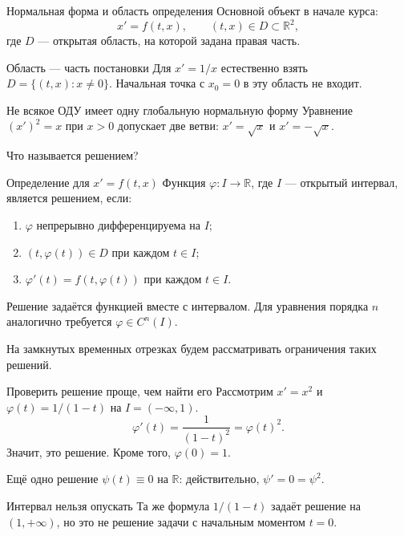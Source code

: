\documentclass[aspectratio=169,11pt]{beamer}
\newcommand{\R}{\mathbb R}
\begin{document}
\begin{frame}{Нормальная форма и область определения}
  Основной объект в начале курса:
  \[
    \boxed{x'=f(t,x)},\qquad (t,x)\in D\subset\R^2,
  \]
  где $D$ --- открытая область, на которой задана правая часть.
  \begin{exampleblock}{Область --- часть постановки}
    Для $x'=1/x$ естественно взять $D=\{(t,x):x\ne0\}$.
    Начальная точка с $x_0=0$ в эту область не входит.
  \end{exampleblock}
  \begin{alertblock}{Не всякое ОДУ имеет одну глобальную нормальную форму}
    Уравнение $(x')^2=x$ при $x>0$ допускает две ветви:
    $x'=\sqrt{x}$ и $x'=-\sqrt{x}$.
  \end{alertblock}
\end{frame}

\begin{frame}{Что называется решением?}
  \begin{block}{Определение для $x'=f(t,x)$}
    Функция $\varphi:I\to\R$, где $I$ --- открытый интервал,
    является \alert{решением}, если:
    \begin{enumerate}
      \item $\varphi$ непрерывно дифференцируема на $I$;
      \item $(t,\varphi(t))\in D$ при каждом $t\in I$;
      \item $\varphi'(t)=f(t,\varphi(t))$ при каждом $t\in I$.
    \end{enumerate}
  \end{block}
  Решение задаётся \alert{функцией вместе с интервалом}.
  Для уравнения порядка $n$ аналогично требуется $\varphi\in C^n(I)$.
  \medskip

  На замкнутых временных отрезках будем рассматривать ограничения таких решений.
\end{frame}

\begin{frame}{Проверить решение проще, чем найти его}
  Рассмотрим $x'=x^2$ и $\varphi(t)=1/(1-t)$ на $I=(-\infty,1)$.
  \[
    \varphi'(t)=\frac{1}{(1-t)^2}=\varphi(t)^2.
  \]
  Значит, это решение. Кроме того, $\varphi(0)=1$.
  \begin{exampleblock}{Ещё одно решение}
    $\psi(t)\equiv0$ на $\R$: действительно, $\psi'=0=\psi^2$.
  \end{exampleblock}
  \begin{alertblock}{Интервал нельзя опускать}
    Та же формула $1/(1-t)$ задаёт решение на $(1,+\infty)$,
    но это не решение задачи с начальным моментом $t=0$.
  \end{alertblock}
\end{frame}
\end{document}

